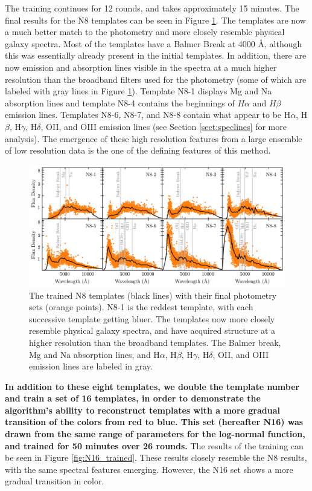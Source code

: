 \documentclass[twocolumn]{aastex63}
\begin{document}
    The training continues for 12 rounds, and takes approximately 15 minutes.
    The final results for the N8 templates can be seen in Figure \ref{fig:N8_trained}.
    The templates are now a much better match to the photometry and more closely resemble physical galaxy spectra.
    Most of the templates have a Balmer Break at 4000 \AA, although this was essentially already present in the initial templates.
    In addition, there are now emission and absorption lines visible in the spectra at a much higher resolution than the broadband filters used for the photometry (some of which are labeled with gray lines in Figure \ref{fig:N8_trained}).
    Template N8-1 displays Mg and Na absorption lines and template N8-4 contains the beginnings of $H\alpha$ and $H\beta$ emission lines.
    Templates N8-6, N8-7, and N8-8 contain what appear to be H$\alpha$, H$\beta$, H$\gamma$, H$\delta$, OII, and OIII emission lines (see Section \ref{sect:speclines} for more analysis).
    The emergence of these high resolution features from a large ensemble of low resolution data is the one of the defining features of this method.

    \begin{figure}
        \centering
        \includegraphics{N8_trained.png}
        \caption{The trained N8 templates (black lines) with their final photometry sets (orange points). N8-1 is the reddest template, with each successive template getting bluer. The templates now more closely resemble physical galaxy spectra, and have acquired structure at a higher resolution than the broadband templates. The Balmer break, Mg and Na absorption lines, and H$\alpha$, H$\beta$, H$\gamma$, H$\delta$, OII, and OIII emission lines are labeled in gray.}
        \label{fig:N8_trained}
    \end{figure}

    \textbf{In addition to these eight templates, we double the template number and train a set of 16 templates, in order to demonstrate the algorithm's ability to reconstruct templates with a more gradual transition of the colors from red to blue.
    This set (hereafter N16) was drawn from the same range of parameters for the log-normal function, and trained for 50 minutes over 26 rounds.}
    The results of the training can be seen in Figure \ref{fig:N16_trained}.
    These results closely resemble the N8 results, with the same spectral features emerging.
    However, the N16 set shows a more gradual transition in color.
\end{document}

